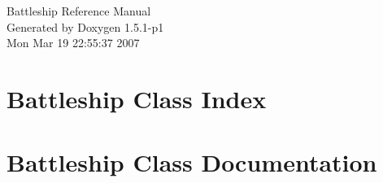 \documentclass[a4paper]{book}
\begin{document}
\begin{titlepage}
\vspace*{7cm}
\begin{center}
{\Large Battleship Reference Manual}\\
\vspace*{1cm}
{\large Generated by Doxygen 1.5.1-p1}\\
\vspace*{0.5cm}
{\small Mon Mar 19 22:55:37 2007}\\
\end{center}
\end{titlepage}
\clearemptydoublepage
{}
\tableofcontents
\clearemptydoublepage
{}
\chapter{Battleship Class Index}

\chapter{Battleship Class Documentation}

\printindex
\end{document}
